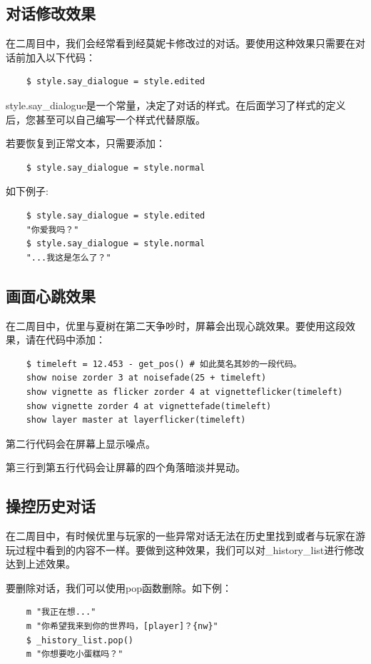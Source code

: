 \documentclass[../../Main.tex]{subfiles}
\begin{document}
\subsection{对话修改效果}
在二周目中，我们会经常看到经莫妮卡修改过的对话。要使用这种效果只需要在对话前加入以下代码：
\begin{lstlisting}
    $ style.say_dialogue = style.edited
\end{lstlisting}

\begin{ExtraKnowledge}
    style.say\_dialogue是一个常量，决定了对话的样式。在后面学习了样式的定义后，您甚至可以自己编写一个样式代替原版。
\end{ExtraKnowledge}

若要恢复到正常文本，只需要添加：
\begin{lstlisting}
    $ style.say_dialogue = style.normal
\end{lstlisting}

如下例子:
\begin{lstlisting}
    $ style.say_dialogue = style.edited
    "你爱我吗？"
    $ style.say_dialogue = style.normal
    "...我这是怎么了？"
\end{lstlisting}

\subsection{画面心跳效果}
在二周目中，优里与夏树在第二天争吵时，屏幕会出现心跳效果。要使用这段效果，请在代码中添加：
\begin{lstlisting}
    $ timeleft = 12.453 - get_pos() # 如此莫名其妙的一段代码。
    show noise zorder 3 at noisefade(25 + timeleft) 
    show vignette as flicker zorder 4 at vignetteflicker(timeleft)
    show vignette zorder 4 at vignettefade(timeleft)
    show layer master at layerflicker(timeleft)
\end{lstlisting}

第二行代码会在屏幕上显示噪点。

第三行到第五行代码会让屏幕的四个角落暗淡并晃动。

\subsection{操控历史对话}
在二周目中，有时候优里与玩家的一些异常对话无法在历史里找到或者与玩家在游玩过程中看到的内容不一样。要做到这种效果，我们可以对\_history\_list进行修改达到上述效果。

要删除对话，我们可以使用pop函数删除。如下例：
\begin{lstlisting}
    m "我正在想..."
    m "你希望我来到你的世界吗，[player]？{nw}"
    $ _history_list.pop()
    m "你想要吃小蛋糕吗？"
\end{lstlisting}
\end{document}
